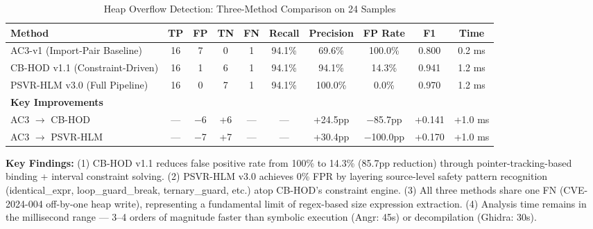 \begin{table}[htbp]
\centering
\caption{Heap Overflow Detection: Three-Method Comparison on 24 Samples}
\label{tab:cb_hod_comparison}
\begin{tabular}{@{}lccccccccc@{}}
\toprule
\textbf{Method} & \textbf{TP} & \textbf{FP} & \textbf{TN} & \textbf{FN} &
\textbf{Recall} & \textbf{Precision} & \textbf{FP Rate} & \textbf{F1} & \textbf{Time} \\
\midrule
AC3-v1 (Import-Pair Baseline)  & 16 & 7  & 0 & 1 & 94.1\% & 69.6\%  & 100.0\% & 0.800 & 0.2 ms \\
CB-HOD v1.1 (Constraint-Driven) & 16 & 1  & 6 & 1 & 94.1\% & 94.1\%  & 14.3\%  & 0.941 & 1.2 ms \\
PSVR-HLM v3.0 (Full Pipeline)   & 16 & 0  & 7 & 1 & 94.1\% & 100.0\% & 0.0\%   & 0.970 & 1.2 ms \\
\midrule
\textbf{Key Improvements} \\
\midrule
AC3 $\rightarrow$ CB-HOD & — & $-$6 & +6 & — & — & +24.5pp & $-$85.7pp & +0.141 & +1.0 ms \\
AC3 $\rightarrow$ PSVR-HLM & — & $-$7 & +7 & — & — & +30.4pp & $-$100.0pp & +0.170 & +1.0 ms \\
\bottomrule
\end{tabular}
\par\smallskip\small
\textbf{Key Findings:}
(1) CB-HOD v1.1 reduces false positive rate from 100\% to 14.3\% (85.7pp reduction)
through pointer-tracking-based binding + interval constraint solving.
(2) PSVR-HLM v3.0 achieves 0\% FPR by layering source-level safety pattern recognition
(identical\_expr, loop\_guard\_break, ternary\_guard, etc.) atop CB-HOD's constraint engine.
(3) All three methods share one FN (CVE-2024-004 off-by-one heap write), representing
a fundamental limit of regex-based size expression extraction.
(4) Analysis time remains in the millisecond range — 3--4 orders of magnitude
faster than symbolic execution (Angr: 45s) or decompilation (Ghidra: 30s).
\end{table}

